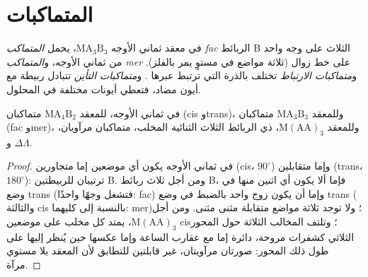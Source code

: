 \section{المتماكبات}

\begin{definition}\label{def:b2:coordination-complexes:isomers}
في معقد ثماني الأوجه $\mathrm{MA_3B_3}$، يحمل \emph{المتماكب fac}
الربائط B الثلاث على وجه واحد من ثماني الأوجه، و\emph{المتماكب
mer} على خط زوال (ثلاثة مواضع في مستوٍ يمر
بالفلز). و\emph{متماكبات الارتباط} تختلف بالذرة التي
ترتبط عبرها . و\emph{متماكبات التأين}
تتبادل ربيطة مع أيون مضاد، فتعطي أيونات مختلفة في المحلول.
\end{definition}

\begin{proposition}\label{prop:b2:coordination-complexes:isomer-count}
في ثماني الأوجه، للمعقد $\mathrm{MA_4B_2}$ متماكبان (cis وtrans)، وللمعقد $\mathrm{MA_3B_3}$ متماكبان
(fac وmer)، وللمعقد $\mathrm M(\mathrm{AA})_3$، ذي الربائط الثلاث الثنائية المخلب، متماكبان
مرآويان، $\Delta$ و$\Lambda$.
\end{proposition}

\begin{proof}
في ثماني الأوجه يكون أي موضعين إما متجاورين (cis، $90^\circ$) وإما متقابلين
(trans، $180^\circ$): ترتيبان للربيطتين B. ومن أجل ثلاث ربائط B،
فإما ألا يكون أي اثنين منها في وضع trans (فتشغل وجهًا واحدًا: fac) وإما أن يكون زوج واحد بالضبط في وضع trans (
والثالثة cis بالنسبة إلى كليهما: mer)؛ ولا توجد ثلاثة مواضع متقابلة مثنى مثنى. ومن أجل
$\mathrm M(\mathrm{AA})_3$، يمتد كل مخلب على موضعين cis؛ وتلتف المخالب الثلاثة
حول المحور الثلاثي كشفرات مروحة، دائرة إما مع عقارب الساعة
وإما عكسها حين يُنظر إليها على طول ذلك المحور: صورتان مرآويتان، غير قابلتين للتطابق
لأن المعقد بلا مستوي مرآة.
\end{proof}

